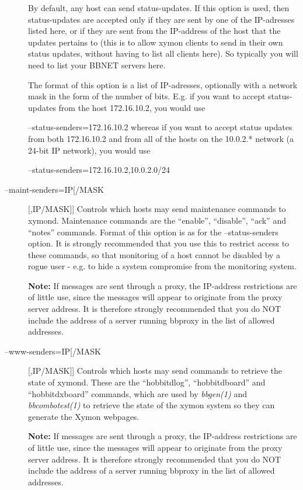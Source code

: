\begin{description}
  By default, any host can send status-updates. If this option is used, then status-updates are accepted only if they are sent by one of the IP-adresses listed here, or if they are sent from the IP-address of the host that the updates pertains to (this is to allow xymon clients to send in their own status updates, without having to list all clients here). So typically you will need to list your BBNET servers here. 


  The format of this option is a list of IP-adresses, optionally with a network mask in the form of the number of bits. E.g. if you want to accept status-updates from the host 172.16.10.2, you would use  
 
--status-senders=172.16.10.2  
 whereas if you want to accept status updates from both 172.16.10.2 and from all of the hosts on the 10.0.2.* network (a 24-bit IP network), you would use  
 
--status-senders=172.16.10.2,10.0.2.0/24 


 

\item[--maint-senders=IP[/MASK][,IP/MASK]] Controls which hosts may send maintenance commands to xymond. Maintenance commands are the ``enable'', ``disable'', ``ack'' and ``notes'' commands. Format of this option is as for the --status-senders option. It is strongly recommended that you use this to restrict access to these commands, so that monitoring of a host cannot be disabled by a rogue user - e.g. to hide a system compromise from the monitoring system. 

 \textbf{Note:}
 If messages are sent through a proxy, the IP-address restrictions are of little use, since the messages will appear to originate from the proxy server address. It is therefore strongly recommended that you do NOT include the address of a server running bbproxy in the list of allowed addresses. 


 

\item[--www-senders=IP[/MASK][,IP/MASK]] Controls which hosts may send commands to retrieve the state of xymond. These are the ``hobbitdlog'', ``hobbitdboard'' and ``hobbitdxboard'' commands, which are used by \emph{bbgen(1)}
 and \emph{bbcombotest(1)}
 to retrieve the state of the xymon system so they can generate the Xymon webpages. 

 \textbf{Note:}
 If messages are sent through a proxy, the IP-address restrictions are of little use, since the messages will appear to originate from the proxy server address. It is therefore strongly recommended that you do NOT include the address of a server running bbproxy in the list of allowed addresses. 



\end{description}
